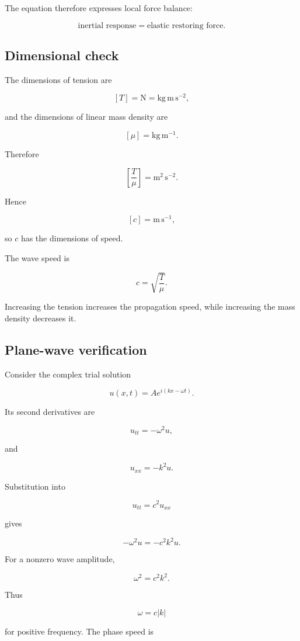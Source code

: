 The equation therefore expresses local force balance:

\[
\text{inertial response}
=
\text{elastic restoring force}.
\]

\subsection{Dimensional check}

The dimensions of tension are

\[
[T]=\mathrm{N}=\mathrm{kg\,m\,s^{-2}},
\]

and the dimensions of linear mass density are

\[
[\mu]=\mathrm{kg\,m^{-1}}.
\]

Therefore

\[
\left[\frac{T}{\mu}\right]
=
\mathrm{m^{2}\,s^{-2}}.
\]

Hence

\[
[c]
=
\mathrm{m\,s^{-1}},
\]

so \(c\) has the dimensions of speed.

The wave speed is

\[
\boxed{
c=\sqrt{\frac{T}{\mu}}
}.
\]

Increasing the tension increases the propagation speed, while increasing the mass density decreases it.

\subsection{Plane-wave verification}

Consider the complex trial solution

\[
u(x,t)
=
A e^{i(kx-\omega t)}.
\]

Its second derivatives are

\[
u_{tt}
=
-\omega^{2}u,
\]

and

\[
u_{xx}
=
-k^{2}u.
\]

Substitution into

\[
u_{tt}=c^{2}u_{xx}
\]

gives

\[
-\omega^{2}u
=
-c^{2}k^{2}u.
\]

For a nonzero wave amplitude,

\[
\boxed{
\omega^{2}=c^{2}k^{2}
}.
\]

Thus

\[
\omega=c|k|
\]

for positive frequency. The phase speed is

